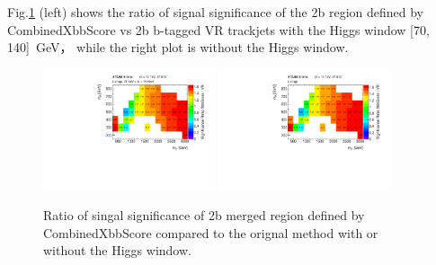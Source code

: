 \par   Fig.\ref{fig:ss_ratio} (left) shows the ratio of signal significance of the 2b region defined by CombinedXbbScore vs 2b b-tagged VR trackjets with the Higgs window [70, 140]~GeV，
while the right plot is without the Higgs window.
\begin{figure}[h]
    \centering
    \includegraphics[width=0.45\textwidth]{appendices/fig/2b-tags_XbbScoreoverVR_HiggsWindow.pdf}
    \includegraphics[width=0.45\textwidth]{appendices/fig/2b-tags_XbbScoreoverVR.pdf}
    \caption{Ratio of singal significance of 2b merged region defined by CombinedXbbScore compared to the orignal method with or without the Higgs window.}

    \label{fig:ss_ratio}

\end{figure}

